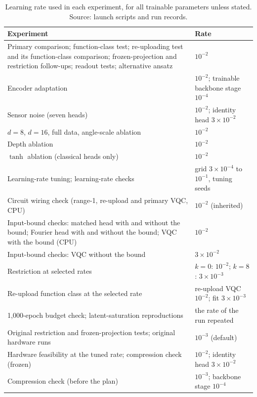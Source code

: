 \documentclass{ieeeaccess}
\newcommand{\vqc}{VQC}
\begin{document}
\begin{table}[h]
\caption{Learning rate used in each experiment, for all trainable parameters unless stated. Source: launch scripts and run records.}
\label{tab:lrused}
\centering
\setlength{\tabcolsep}{3pt}
\footnotesize
\begin{tabular}{@{}L{5.2cm}L{2.7cm}@{}}
\toprule
Experiment & Rate\\
\midrule
Primary comparison; function-class test; re-uploading test and its function-class comparison; frozen-projection and restriction follow-ups; readout tests; alternative ansatz & $10^{-2}$\\
Encoder adaptation & $10^{-2}$; trainable backbone stage $10^{-4}$\\
Sensor noise (seven heads) & $10^{-2}$; identity head $3\times10^{-2}$\\
$d=8$, $d=16$, full data, angle-scale ablation & $10^{-2}$\\
Depth ablation & $10^{-2}$\\
$\tanh$ ablation (classical heads only) & $10^{-2}$\\
Learning-rate tuning; learning-rate checks & grid $3\times10^{-4}$ to $10^{-1}$, tuning seeds\\
Circuit wiring check (range-1, re-upload and primary \vqc{}, CPU) & $10^{-2}$ (inherited)\\
Input-bound checks: matched head with and without the bound; Fourier head with and without the bound; \vqc{} with the bound (CPU) & $10^{-2}$\\
Input-bound checks: \vqc{} without the bound & $3\times10^{-2}$\\
Restriction at selected rates & $k=0$: $10^{-2}$; $k=8$: $3\times10^{-3}$\\
Re-upload function class at the selected rate & re-upload \vqc{} $10^{-2}$; fit $3\times10^{-3}$\\
1,000-epoch budget check; latent-saturation reproductions & the rate of the run repeated\\
Original restriction and frozen-projection tests; original hardware runs & $10^{-3}$ (default)\\
Hardware feasibility at the tuned rate; compression check (frozen) & $10^{-2}$; identity head $3\times10^{-2}$\\
Compression check (before the plan) & $10^{-3}$; backbone stage $10^{-4}$\\
\bottomrule
\end{tabular}
\end{table}
\end{document}
